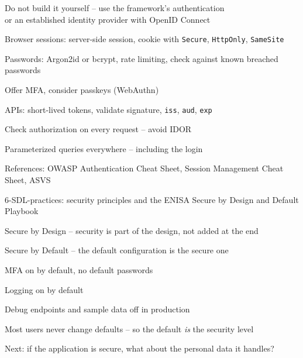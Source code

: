 \documentclass[Screen16to9,17pt]{foils}
\begin{document}

\begin{list2}
\item Do not build it yourself -- use the framework's authentication\\
  or an established identity provider with OpenID Connect
\item Browser sessions: server-side session, cookie with \verb+Secure+, \verb+HttpOnly+, \verb+SameSite+
\item Passwords: Argon2id or bcrypt, rate limiting, check against known breached passwords
\item Offer MFA, consider passkeys (WebAuthn)
\item APIs: short-lived tokens, validate signature, \verb+iss+, \verb+aud+, \verb+exp+
\item Check authorization on every request -- avoid IDOR
\item Parameterized queries everywhere -- including the login
\item References: OWASP Authentication Cheat Sheet, Session Management Cheat Sheet, ASVS\\
\end{list2}



\begin{list2}
\item 6-SDL-practices: security principles and the ENISA Secure by Design and Default Playbook
\item Secure by Design -- security is part of the design, not added at the end
\item Secure by Default -- the default configuration is the secure one
\begin{list2}
\item MFA on by default, no default passwords
\item Logging on by default
\item Debug endpoints and sample data off in production
\end{list2}
\item Most users never change defaults -- so the default \emph{is} the security level
\item Next: if the application is secure, what about the personal data it handles?
\end{list2}


\end{document}
